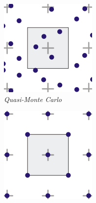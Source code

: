 \begin{figure}[htbp]
    \begin{subfigure}[b]{0.25\textwidth}
        \centering
        \includegraphics[width=\textwidth]{Plantilla-TFG-master/img/aa4.png}
        \caption{\textit{Quasi-Monte Carlo}}
    \end{subfigure}
    \hfill
    \begin{subfigure}[b]{0.25\textwidth}
        \centering
        \includegraphics[width=\textwidth]{Plantilla-TFG-master/img/aa5.png}

\end{subfigure}
\end{figure}
